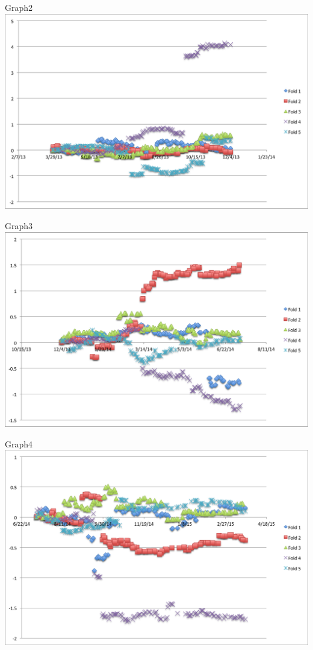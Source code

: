 \documentclass[11pt,letterpaper]{article}
\begin{document}
\begin{itemize}
  Graph2 \\
  
\includegraphics[width=14cm]{images/weighted-exp-1.png}

  Graph3 \\
  
\includegraphics[width=14cm]{images/weighted-exp-2.png}

  Graph4 \\
  
\includegraphics[width=14cm]{images/weighted-exp-3.png}

\end{itemize}
\end{document}
